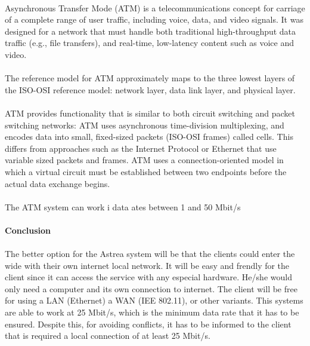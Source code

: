 \paragraph{} 
Asynchronous Transfer Mode (ATM) is a telecommunications concept for carriage of a complete range of user traffic, including voice, data, and video signals. It was designed for a network that must handle both traditional high-throughput data traffic (e.g., file transfers), and real-time, low-latency content such as voice and video. 
\paragraph{}
The reference model for ATM approximately maps to the three lowest layers of the ISO-OSI reference model: network layer, data link layer, and physical layer.
\paragraph{}
ATM provides functionality that is similar to both circuit switching and packet switching networks: ATM uses asynchronous time-division multiplexing, and encodes data into small, fixed-sized packets (ISO-OSI frames) called cells. This differs from approaches such as the Internet Protocol or Ethernet that use variable sized packets and frames. ATM uses a connection-oriented model in which a virtual circuit must be established between two endpoints before the actual data exchange begins.
\paragraph{}
The ATM system can work i data ates between 1 and 50 Mbit/s

\paragraph{} \textbf{Conclusion}
\paragraph{}
The better option for the Astrea system will be that the clients could enter the wide with their own internet local network. It will be easy and frendly for the client since it can access the service with any especial hardware. He/she would only need a computer and its own connection to internet. The client will be free for using a LAN (Ethernet) a WAN (IEE 802.11), or other variants. This systems are able to work at 25 Mbit/s, which is the minimum data rate that it has to be ensured. Despite this, for avoiding conflicts, it has to be informed to the client that is required a local connection of at least 25 Mbit/s.
